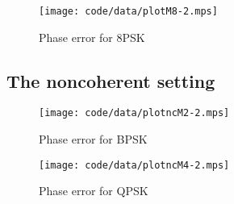 \documentclass[a4paper,10pt]{article}
\begin{document}
\begin{figure*}[tp]
	\centering
		\texttt{[image: code/data/plotM8-2.mps]}
		\caption{Phase error for 8PSK}
		\label{fig:plotphase}
\end{figure*}


\subsection{The noncoherent setting}



\begin{figure*}[tp]
	\centering
		\texttt{[image: code/data/plotncM2-2.mps]}
		\caption{Phase error for BPSK}
		\label{fig:plotphase}
\end{figure*}




\begin{figure*}[tp]
	\centering
		\texttt{[image: code/data/plotncM4-2.mps]}
		\caption{Phase error for QPSK}
		\label{fig:plotphase}
\end{figure*}


\end{document}
